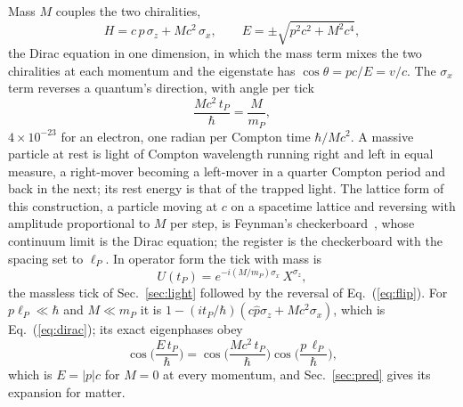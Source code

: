 \documentclass[aps,prd,twocolumn,superscriptaddress,nofootinbib]{revtex4-2}
\begin{document}
Mass $M$ couples the two chiralities,
\begin{equation}
H = c\,\hat p\,\sigma_z + Mc^2\,\sigma_x, \qquad E = \pm\sqrt{p^2c^2 + M^2c^4},
\label{eq:dirac}
\end{equation}
the Dirac equation in one dimension, in which the mass term mixes the two chiralities at each momentum and the eigenstate has $\cos\theta = pc/E = v/c$. The $\sigma_x$ term reverses a quantum's direction, with angle per tick
\begin{equation}
\frac{Mc^2\,t_P}{\hbar} = \frac{M}{m_P} ,
\label{eq:flip}
\end{equation}
$4\times10^{-23}$ for an electron, one radian per Compton time $\hbar/Mc^2$. A massive particle at rest is light of Compton wavelength running right and left in equal measure, a right-mover becoming a left-mover in a quarter Compton period and back in the next; its rest energy is that of the trapped light. The lattice form of this construction, a particle moving at $c$ on a spacetime lattice and reversing with amplitude proportional to $M$ per step, is Feynman's checkerboard~\cite{feynman1965,jacobson1984,bialynicki1994}, whose continuum limit is the Dirac equation; the register is the checkerboard with the spacing set to $\ell_P$. In operator form the tick with mass is
\begin{equation}
U(t_P) = e^{-i(M/m_P)\sigma_x}\,X^{\sigma_z},
\label{eq:tick}
\end{equation}
the massless tick of Sec.~\ref{sec:light} followed by the reversal of Eq.~(\ref{eq:flip}). For $p\ell_P \ll \hbar$ and $M \ll m_P$ it is $1 - (it_P/\hbar)(c\hat p\sigma_z + Mc^2\sigma_x)$, which is Eq.~(\ref{eq:dirac}); its exact eigenphases obey
\begin{equation}
\cos\!\Big(\frac{E\,t_P}{\hbar}\Big) = \cos\!\Big(\frac{Mc^2\,t_P}{\hbar}\Big)\cos\!\Big(\frac{p\,\ell_P}{\hbar}\Big),
\label{eq:walk}
\end{equation}
which is $E = |p|c$ for $M = 0$ at every momentum, and Sec.~\ref{sec:pred} gives its expansion for matter.
\end{document}
